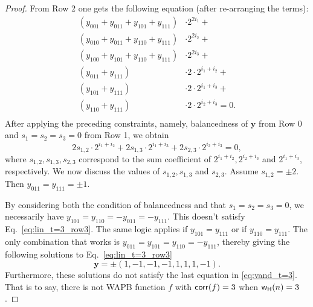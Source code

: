 \begin{proof}
    From Row 2 one gets the following equation (after re-arranging the terms):
    \begin{equation}\label{eq:lin_t=3_row3}
        \begin{split}
            (y_{001} + y_{011} + y_{101} + y_{111}) &\cdot 2^{2i_1} +\\
            (y_{010} + y_{011} + y_{110} + y_{111}) &\cdot 2^{2i_2} +\\
            (y_{100} + y_{101} + y_{110} + y_{111}) &\cdot 2^{2i_3} +\\
            (y_{011} + y_{111}) &\cdot 2 \cdot 2^{i_1 + i_2} +\\
            (y_{101} + y_{111}) &\cdot 2 \cdot 2^{i_1 + i_3} +\\
            (y_{110} + y_{111}) &\cdot 2 \cdot 2^{i_2 + i_3} = 0.\\
        \end{split}
    \end{equation}
    After applying the preceding constraints, namely, balancedness of $\mathbf{y}$ from Row 0 and $s_1=s_2=s_3=0$ from Row 1, we obtain
    \[
     2s_{1,2} \cdot 2^{i_1 + i_2} + 2s_{1,3} \cdot 2^{i_1 + i_3} + 2s_{2,3} \cdot 2^{i_2 + i_3} = 0,
    \] where $s_{1,2}, s_{1,3},s_{2,3}$ correspond to the sum coefficient of $2^{i_{1}+i_2}, 2^{i_{2}+i_3}$ and $2^{i_{1}+i_3}$, respectively.
    We now discuss the values of $s_{1,2}, s_{1,3}$ and $s_{2,3}$.
    Assume $s_{1,2} = \pm 2$.
    Then $y_{011} = y_{111} = \pm 1$.


    By considering both the condition of balancedness
    and that $s_1 = s_2 = s_3 = 0$, we necessarily have $y_{101} = y_{110} = -y_{011} = -y_{111}$.
    This doesn't satisfy Eq.~\eqref{eq:lin_t=3_row3}. The same logic applies
    if $y_{101} = y_{111}$ or if $y_{110} = y_{111}$. The only combination that
    works is $y_{011} = y_{101} = y_{110} = -y_{111}$, thereby giving the following solutions to Eq.~\eqref{eq:lin_t=3_row3}
    $$
    \mathbf{y} = \pm(1, -1, -1, -1, 1, 1, 1, -1).
    $$
    Furthermore, these solutions do not satisfy the last equation in \eqref{eq:vand_t=3}. That is to say, there is not WAPB function $f$ with $\mathsf{corr}(f) = 3$ when $\mathsf{w_H}(n)=3$.
\end{proof}

